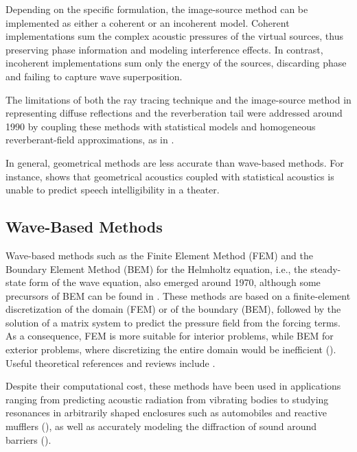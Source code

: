 \documentclass{Configuration_Files/PoliMi3i_thesis}
\begin{document}
Depending on the specific formulation, the image-source method can be implemented as either a coherent or an incoherent model. Coherent implementations sum the complex acoustic pressures of the virtual sources, thus preserving phase information and modeling interference effects. In contrast, incoherent implementations sum only the energy of the sources, discarding phase and failing to capture wave superposition.

The limitations of both the ray tracing technique and the image-source method in representing diffuse reflections and the reverberation tail were addressed around 1990 by coupling these methods with statistical models and homogeneous reverberant-field approximations, as in \cite{rindel_computer_1992,naylor_odeonanother_1993,maercke_prediction_1993,heinz_binaural_1993}.

In general, geometrical methods are less accurate than wave-based methods. For instance, \cite{kleiner_speech_1978} shows that geometrical acoustics coupled with statistical acoustics is unable to predict speech intelligibility in a theater.

\subsection{Wave-Based Methods}
Wave-based methods such as the Finite Element Method (FEM) and the Boundary Element Method (BEM) for the Helmholtz equation, i.e., the steady-state form of the wave equation, also emerged around 1970, although some precursors of BEM can be found in \cite{chen_sound_1963,chertock_sound_1964,copley_integral_1967,schenck_improved_1968}. These methods are based on a finite-element discretization of the domain (FEM) or of the boundary (BEM), followed by the solution of a matrix system to predict the pressure field from the forcing terms. As a consequence, FEM is more suitable for interior problems, while BEM for exterior problems, where discretizing the entire domain would be inefficient (\cite{filippi_theoretical_1983}). Useful theoretical references and reviews include \cite{filippi_theoretical_1983,seybert_review_1985,kipp_prediction_1985,ihlenburg_finite_1995}.

Despite their computational cost, these methods have been used in applications ranging from predicting acoustic radiation from vibrating bodies to studying resonances in arbitrarily shaped enclosures such as automobiles and reactive mufflers (\cite{craggs_use_1972,shuku_analysis_1973,petyt_finite_1976,kagawa_finiteelement_1976,joppa_finite_1978,richards_simplified_1979,cederfeldt_use_1982,nefske_application_1984}), as well as accurately modeling the diffraction of sound around barriers (\cite{seznec_diffraction_1980}).
\end{document}
